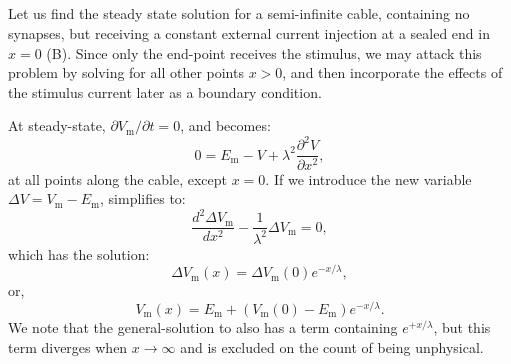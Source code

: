 \subsection{}
\label{sec:Neuron:cableSS}
Let us find the steady state solution for a semi-infinite cable, containing no synapses, but receiving a constant external current injection at a sealed end in $x=0$ (B). Since only the end-point receives the stimulus, we may attack this problem by solving  for all other points $x>0$, and then incorporate the effects of the stimulus current later as a boundary condition. 

At steady-state, $\partial V_\mathrm{m}/\partial t = 0$, and  becomes:
\begin{equation}
0 = E_\text{m}-V +  \lambda^2 \frac{\partial^2 V}{\partial x^2},
\label{eq:Neuron:semiinf}
\end{equation}
at all points along the cable, except $x=0$. If we introduce the new variable $\Delta{V}=V_\mathrm{m}-E_\mathrm{m}$,  simplifies to:
\begin{equation}
\frac{d^2 \Delta{V_\mathrm{m}}}{d x^2} -  \frac{1}{\lambda^2} \Delta{V_\mathrm{m}}=0, 
\label{eq:Neuron:semiinf2}
\end{equation}
which has the solution:
\begin{equation}
\Delta{V_\mathrm{m}}(x) = \Delta{V_\mathrm{m}}(0) e^{-x/\lambda}, 
\label{eq:Neuron:semiinf3}
\end{equation}
or, 
\begin{equation}
V_\mathrm{m}(x) = E_\mathrm{m} + \left( V_\mathrm{m}(0)-E_\mathrm{m} \right) e^{-x/\lambda}.
\label{eq:Neuron:semiinf4}
\end{equation}
We note that the general-solution to  also has a term containing $e^{+x/\lambda}$, but this term diverges when $x \rightarrow \infty$ and is excluded on the count of being unphysical.

